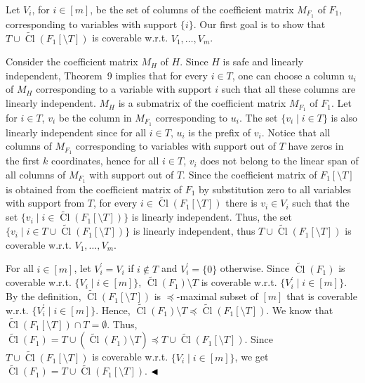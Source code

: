 \documentclass[10pt,a4paper]{article}
\begin{document}
Let $V_{i}$, for $i\in[m]$, be the set of columns of the coefficient matrix $M_{F_{1}}$ of $F_{1}$, corresponding to variables with support $\{i\}$. Our first goal is to show that $T\cup\widetilde{\mathop{\mathrm{Cl}}}(F_{1}[\setminus T])$ is coverable w.r.t. $V_{1},\dots,V_{m}$.\par



Consider the coefficient matrix $M_{H}$ of $H$. Since $H$ is safe and linearly independent, Theorem 9 implies that for every $i\in T$, one can choose a column $u_{i}$ of $M_{H}$ corresponding to a variable with support $i$ such that all these columns are linearly independent. $M_{H}$ is a submatrix of the coefficient matrix $M_{F_{1}}$ of $F_{1}$. Let for $i\in T$, $v_{i}$ be the column in $M_{F_{1}}$ corresponding to $u_{i}$. The set $\{v_{i}\mid i\in T\}$ is also linearly independent since for all $i\in T$, $u_{i}$ is the prefix of $v_{i}$. Notice that all columns of $M_{F_{1}}$ corresponding to variables with support out of $T$ have zeros in the first $k$ coordinates, hence for all $i\in T$, $v_{i}$ does not belong to the linear span of all columns of $M_{F_{1}}$ with support out of $T$. Since the coefficient matrix of $F_{1}[\setminus T]$ is obtained from the coefficient matrix of $F_{1}$ by substitution zero to all variables with support from $T$, for every $i\in\widetilde{\mathop{\mathrm{Cl}}}(F_{1}[\setminus T])$ there is $v_{i}\in V_{i}$ such that the set $\{v_{i}\mid i\in\widetilde{\mathop{\mathrm{Cl}}}(F_{1}[\setminus T])\}$ is linearly independent. Thus, the set $\{v_{i}\mid i\in T\cup\widetilde{\mathop{\mathrm{Cl}}}(F_{1}[\setminus T])\}$ is linearly independent, thus $T\cup\widetilde{\mathop{\mathrm{Cl}}}(F_{1}[\setminus T])$ is coverable w.r.t. $V_{1},\dots,V_{m}$.\par



For all $i\in[m]$, let $V^{\prime}_{i}=V_{i}$ if $i\notin T$ and $V^{\prime}_{i}=\{0\}$ otherwise. Since $\widetilde{\mathop{\mathrm{Cl}}}(F_{1})$ is coverable w.r.t. $\{V_{i}\mid i\in[m]\}$, $\widetilde{\mathop{\mathrm{Cl}}}(F_{1})\setminus T$ is coverable w.r.t. $\{V^{\prime}_{i}\mid i\in[m]\}$. By the definition, $\widetilde{\mathop{\mathrm{Cl}}}(F_{1}[\setminus T])$ is $\preceq$-maximal subset of $[m]$ that is coverable w.r.t. $\{V^{\prime}_{i}\mid i\in[m]\}$. Hence, $\widetilde{\mathop{\mathrm{Cl}}}(F_{1})\setminus T\preceq\widetilde{\mathop{\mathrm{Cl}}}(F_{1}[\setminus T])$.
We know that $\widetilde{\mathop{\mathrm{Cl}}}(F_{1}[\setminus T])\cap T=\emptyset$. Thus, $\widetilde{\mathop{\mathrm{Cl}}}(F_{1})=T\cup(\widetilde{\mathop{\mathrm{Cl}}}(F_{1})\setminus T)\preceq T\cup\widetilde{\mathop{\mathrm{Cl}}}(F_{1}[\setminus T])$. Since $T\cup\widetilde{\mathop{\mathrm{Cl}}}(F_{1}[\setminus T])$ is coverable w.r.t. $\{V_{i}\mid i\in[m]\}$, we get $\widetilde{\mathop{\mathrm{Cl}}}(F_{1})=T\cup\widetilde{\mathop{\mathrm{Cl}}}(F_{1}[\setminus T])$.
$\hfill\blacktriangleleft$\par
\end{document}
